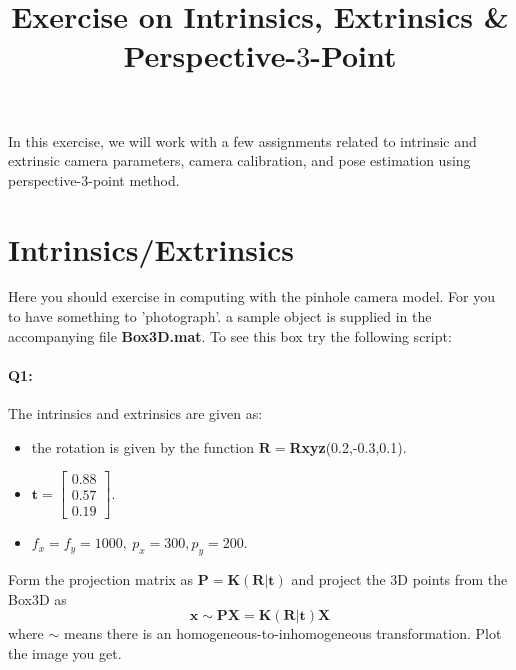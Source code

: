 \documentclass[a4paper]{article}
\begin{document}
\title{Exercise on Intrinsics, Extrinsics \& Perspective-$3$-Point}
\maketitle%

In this exercise, we will work with a few assignments related to intrinsic and extrinsic camera parameters, camera calibration, and pose estimation using perspective-3-point method.

\section{Intrinsics/Extrinsics}
Here you should exercise in computing with the pinhole camera model. For you to have something to 'photograph'. a sample object is supplied in the accompanying file \textbf{Box3D.mat}. To see this box try the following script:

\paragraph{Q1:} 
The intrinsics and extrinsics are given as: 
\begin{itemize}
\item the rotation is given by the function $\mathbf{R}=$\textbf{Rxyz}(0.2,-0.3,0.1).
\item $\mathbf{t}= \left[\begin{matrix}
0.88 \\ 0.57 \\  0.19
 \end{matrix}\right]$.
 \item $f_x=f_y=1000,\ p_x = 300, p_y = 200$.
\end{itemize}
Form the projection matrix as $\mathbf{P}=\mathbf{K}\left(\mathbf{R} | \mathbf{t}\right)$ and project the $3$D points from the Box3D as
$$
\mathbf{x} \sim \mathbf{PX}=\mathbf{K}\left(\mathbf{R} | \mathbf{t}\right) \mathbf{X}
$$
where $\sim$ means there is an homogeneous-to-inhomogeneous transformation.
Plot the image you get. 
\end{document}
